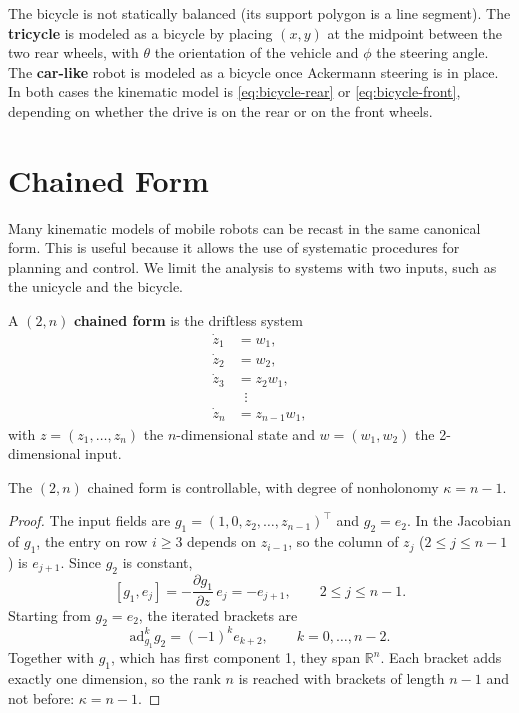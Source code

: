 \begin{nb}
The bicycle is not statically balanced (its support polygon is a line
segment). The \textbf{tricycle} is modeled as a bicycle by placing
\( (x, y) \) at the midpoint between the two rear wheels, with \( \theta \)
the orientation of the vehicle and \( \phi \) the steering angle. The
\textbf{car-like} robot is modeled as a bicycle once Ackermann steering
is in place. In both cases the kinematic model is
\cref{eq:bicycle-rear} or \cref{eq:bicycle-front}, depending on whether
the drive is on the rear or on the front wheels.
\end{nb}

\section{Chained Form}
\label{sec:chained-form}

Many kinematic models of mobile robots can be recast in the same
canonical form. This is useful because it allows the use of systematic
procedures for planning and control. We limit the analysis to systems
with two inputs, such as the unicycle and the bicycle.

\begin{definition}
A \( (2, n) \) \textbf{chained form} is the driftless system
\begin{equation}
\label{eq:chained}
\begin{aligned}
    \dot{z}_1 &= w_1, \\
    \dot{z}_2 &= w_2, \\
    \dot{z}_3 &= z_2 w_1, \\
              &\;\;\vdots \\
    \dot{z}_n &= z_{n-1} w_1,
\end{aligned}
\end{equation}
with \( z = (z_1, \dots, z_n) \) the \( n \)-dimensional state and
\( w = (w_1, w_2) \) the 2-dimensional input.
\end{definition}

\begin{proposition}
\label{prop:chained-controllable}
The \( (2,n) \) chained form is controllable, with degree of
nonholonomy \( \kappa = n - 1 \).
\end{proposition}

\begin{proof}
The input fields are \( g_1 = (1, 0, z_2, \dots, z_{n-1})^\top \) and
\( g_2 = e_2 \). In the Jacobian of \( g_1 \), the entry on row
\( i \ge 3 \) depends on \( z_{i-1} \), so the column of \( z_j \)
(\( 2 \le j \le n-1 \)) is \( e_{j+1} \). Since \( g_2 \) is constant,
\[
[g_1, e_j] = -\frac{\partial g_1}{\partial z}\, e_j = -e_{j+1},
\qquad 2 \le j \le n-1.
\]
Starting from \( g_2 = e_2 \), the iterated brackets are
\[
\text{ad}_{g_1}^k g_2 = (-1)^k e_{k+2}, \qquad k = 0, \dots, n-2 .
\]
Together with \( g_1 \), which has first component 1, they span
\( \mathbb{R}^n \). Each bracket adds exactly one dimension, so the
rank \( n \) is reached with brackets of length \( n - 1 \) and not
before: \( \kappa = n - 1 \).
\end{proof}

